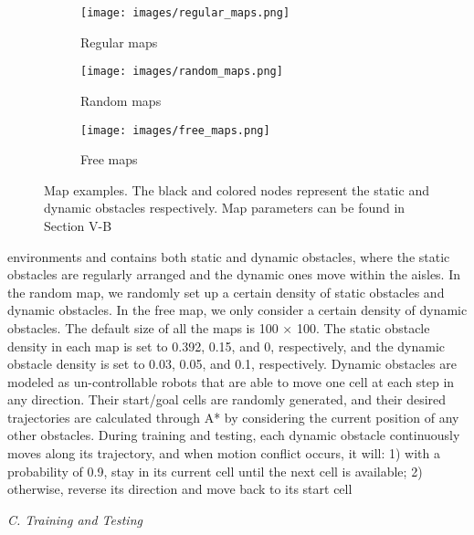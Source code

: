 \documentclass[10pt,twocolumn,letterpaper]{article}
\begin{document}
\nocite{*}


\begin{figure}[t]
  \centering
  \begin{subfigure}{.3\columnwidth}
    \centering
    \texttt{[image: images/regular\_maps.png]}
    \caption{Regular maps}
  \end{subfigure}%
  \hfill
  \begin{subfigure}{.3\columnwidth}
    \centering
    \texttt{[image: images/random\_maps.png]}
    \caption{Random maps}
  \end{subfigure}%
  \hfill
  \begin{subfigure}{.3\columnwidth}
    \centering
    \texttt{[image: images/free\_maps.png]}
    \caption{Free maps}
  \end{subfigure}
  \caption{Map examples. The black and colored nodes represent the static and
dynamic obstacles respectively. Map parameters can be found in Section V-B}
\end{figure}

environments and contains both static and dynamic obstacles,
where the static obstacles are regularly arranged and the
dynamic ones move within the aisles. In the random map,
we randomly set up a certain density of static obstacles and
dynamic obstacles. In the free map, we only consider a certain
density of dynamic obstacles. The default size of all the maps
is 100 × 100. The static obstacle density in each map is set
to 0.392, 0.15, and 0, respectively, and the dynamic obstacle
density is set to 0.03, 0.05, and 0.1, respectively. Dynamic
obstacles are modeled as un-controllable robots that are able
to move one cell at each step in any direction. Their start/goal
cells are randomly generated, and their desired trajectories are
calculated through A* by considering the current position of
any other obstacles. During training and testing, each dynamic
obstacle continuously moves along its trajectory, and when
motion conflict occurs, it will: 1) with a probability of 0.9, stay
in its current cell until the next cell is available; 2) otherwise,
reverse its direction and move back to its start cell

\textit{C. Training and Testing}
\end{document}
